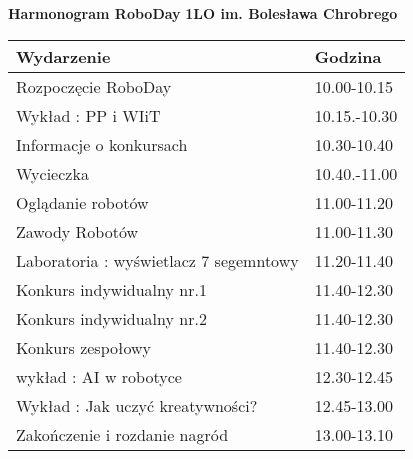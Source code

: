 \documentclass{article}
\begin{document}
\begin{center}
\Large\textbf{Harmonogram RoboDay}
\large\textbf{1LO im. Bolesława Chrobrego}
\end{center}
\vspace{1cm}
\begin{center}
\begin{tabular}{|l|l|}
\hline
\textbf{Wydarzenie} & \textbf{Godzina} \\
\hline
Rozpoczęcie RoboDay & 10.00-10.15 \\
\hline
Wykład : PP i WIiT & 10.15.-10.30 \\
\hline
Informacje o konkursach & 10.30-10.40 \\
\hline
Wycieczka & 10.40.-11.00 \\
\hline
Oglądanie robotów & 11.00-11.20 \\
\hline
Zawody Robotów & 11.00-11.30 \\
\hline
Laboratoria : wyświetlacz 7 segemntowy & 11.20-11.40 \\
\hline
Konkurs indywidualny nr.1 & 11.40-12.30 \\
\hline
Konkurs indywidualny nr.2 & 11.40-12.30 \\
\hline
Konkurs zespołowy & 11.40-12.30 \\
\hline
wykład : AI w robotyce & 12.30-12.45 \\
\hline
Wykład : Jak uczyć kreatywności? & 12.45-13.00 \\
\hline
Zakończenie i rozdanie nagród & 13.00-13.10 \\
\hline
\end{tabular}
\end{center}
\end{document}
